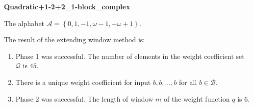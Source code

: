 \begin{exmp}
\textbf{ Quadratic+1-2+2\_1-block\_complex }

\label{ex:Quadratic+1-2+21-blockcomplex}

The alphabet $\mathcal{A} =\left\{0, 1, -1, \omega - 1, -\omega + 1\right\}$.

The result of the extending window method is:
\begin{enumerate}
    \item Phase 1 was successful.
The number of elements in the weight coefficient set $\mathcal{Q}$ is $45$.

    \item There is a unique weight coefficient for input $b,b,\dots,b$ for all $b\in\mathcal{B}$.

    \item Phase 2 was successful.
The length of window $m$ of the weight function $q$ is 6.
\end{enumerate}
\end{exmp}
